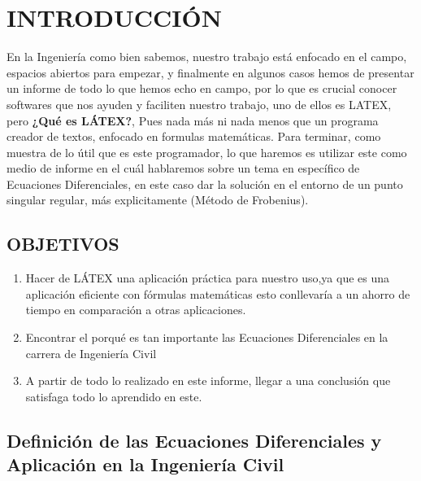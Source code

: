 \documentclass{article}
\begin{document}
{\centering\section{INTRODUCCIÓN}}

\large En la Ingeniería como bien sabemos, nuestro trabajo está enfocado en el campo, espacios abiertos para empezar, y finalmente en algunos casos hemos de presentar un informe de todo lo que hemos echo en campo, por lo que es crucial conocer softwares que nos ayuden y faciliten nuestro trabajo, uno de ellos es LATEX, pero \textbf{¿Qué es LÁTEX?}, Pues nada más ni nada menos que un programa creador de textos, enfocado en formulas matemáticas. Para terminar, como muestra de lo útil que es este programador, lo que haremos es utilizar este como medio de informe en el cuál hablaremos sobre un tema en específico de Ecuaciones Diferenciales, en este caso dar la solución en el entorno de un punto singular regular, más explicitamente (Método de Frobenius).\newline


 \begin{center}
\section{OBJETIVOS}\par
\end{center}
\begin{enumerate}
\vspace{0.5cm}
\item Hacer de LÁTEX una aplicación práctica para nuestro uso,ya que es una aplicación eficiente con fórmulas matemáticas esto conllevaría a un ahorro de tiempo en comparación a otras aplicaciones.
\vspace{0.5cm}
\item Encontrar el porqué es tan importante las Ecuaciones Diferenciales en la carrera de Ingeniería Civil
\vspace{0.5cm}
\item A partir de todo lo realizado en este informe, llegar a una conclusión que satisfaga todo lo aprendido en este.
\end{enumerate}
\vspace{0.5cm}
 
 \begin{center}
\section{Definición de las Ecuaciones Diferenciales y Aplicación en la Ingeniería Civil}\par
\end{center}
\vspace{0.5cm}
\end{document}
